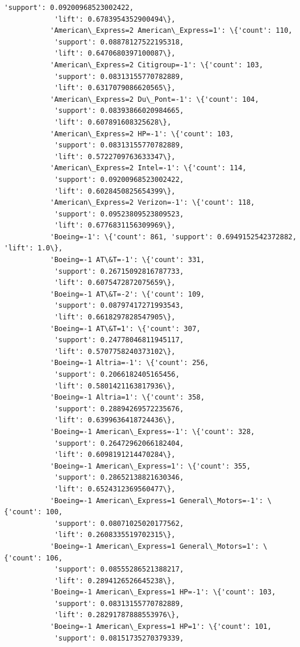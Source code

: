 \documentclass[11pt]{article}
\begin{document}
\begin{Verbatim}[commandchars=\\\{\}]
            'support': 0.09200968523002422,
            'lift': 0.6783954352900494\},
           'American\_Express=2 American\_Express=1': \{'count': 110,
            'support': 0.08878127522195318,
            'lift': 0.6470680397100087\},
           'American\_Express=2 Citigroup=-1': \{'count': 103,
            'support': 0.08313155770782889,
            'lift': 0.6317079086620565\},
           'American\_Express=2 Du\_Pont=-1': \{'count': 104,
            'support': 0.08393866020984665,
            'lift': 0.607891608325628\},
           'American\_Express=2 HP=-1': \{'count': 103,
            'support': 0.08313155770782889,
            'lift': 0.5722709763633347\},
           'American\_Express=2 Intel=-1': \{'count': 114,
            'support': 0.09200968523002422,
            'lift': 0.6028450825654399\},
           'American\_Express=2 Verizon=-1': \{'count': 118,
            'support': 0.09523809523809523,
            'lift': 0.6776831156309969\},
           'Boeing=-1': \{'count': 861, 'support': 0.6949152542372882, 'lift': 1.0\},
           'Boeing=-1 AT\&T=-1': \{'count': 331,
            'support': 0.26715092816787733,
            'lift': 0.6075472872075659\},
           'Boeing=-1 AT\&T=-2': \{'count': 109,
            'support': 0.08797417271993543,
            'lift': 0.6618297828547905\},
           'Boeing=-1 AT\&T=1': \{'count': 307,
            'support': 0.24778046811945117,
            'lift': 0.5707758240373102\},
           'Boeing=-1 Altria=-1': \{'count': 256,
            'support': 0.2066182405165456,
            'lift': 0.5801421163817936\},
           'Boeing=-1 Altria=1': \{'count': 358,
            'support': 0.28894269572235676,
            'lift': 0.6399636418724436\},
           'Boeing=-1 American\_Express=-1': \{'count': 328,
            'support': 0.26472962066182404,
            'lift': 0.6098191214470284\},
           'Boeing=-1 American\_Express=1': \{'count': 355,
            'support': 0.28652138821630346,
            'lift': 0.6524312369560477\},
           'Boeing=-1 American\_Express=1 General\_Motors=-1': \{'count': 100,
            'support': 0.08071025020177562,
            'lift': 0.2608335519702315\},
           'Boeing=-1 American\_Express=1 General\_Motors=1': \{'count': 106,
            'support': 0.08555286521388217,
            'lift': 0.2894126526645238\},
           'Boeing=-1 American\_Express=1 HP=-1': \{'count': 103,
            'support': 0.08313155770782889,
            'lift': 0.28291787888553976\},
           'Boeing=-1 American\_Express=1 HP=1': \{'count': 101,
            'support': 0.08151735270379339,

\end{Verbatim}
\end{document}
